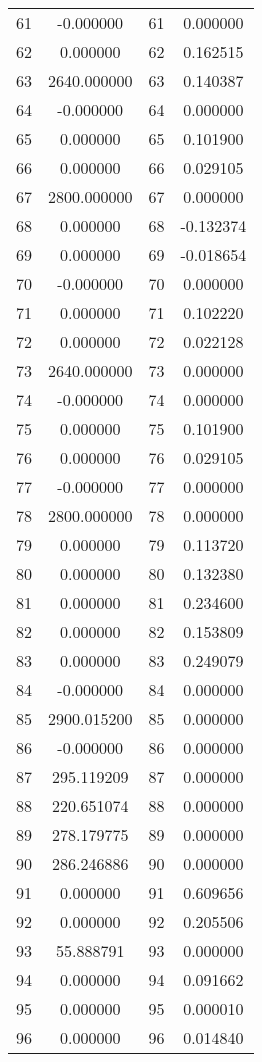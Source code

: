 \documentclass[12pt]{article}
\begin{document}
\begin{longtable}{@{}cccc@{}}
61 & -0.000000 & 61 & 0.000000 \\
62 & 0.000000 & 62 & 0.162515 \\
63 & 2640.000000 & 63 & 0.140387 \\
64 & -0.000000 & 64 & 0.000000 \\
65 & 0.000000 & 65 & 0.101900 \\
66 & 0.000000 & 66 & 0.029105 \\
67 & 2800.000000 & 67 & 0.000000 \\
68 & 0.000000 & 68 & -0.132374 \\
69 & 0.000000 & 69 & -0.018654 \\
70 & -0.000000 & 70 & 0.000000 \\
71 & 0.000000 & 71 & 0.102220 \\
72 & 0.000000 & 72 & 0.022128 \\
73 & 2640.000000 & 73 & 0.000000 \\
74 & -0.000000 & 74 & 0.000000 \\
75 & 0.000000 & 75 & 0.101900 \\
76 & 0.000000 & 76 & 0.029105 \\
77 & -0.000000 & 77 & 0.000000 \\
78 & 2800.000000 & 78 & 0.000000 \\
79 & 0.000000 & 79 & 0.113720 \\
80 & 0.000000 & 80 & 0.132380 \\
81 & 0.000000 & 81 & 0.234600 \\
82 & 0.000000 & 82 & 0.153809 \\
83 & 0.000000 & 83 & 0.249079 \\
84 & -0.000000 & 84 & 0.000000 \\
85 & 2900.015200 & 85 & 0.000000 \\
86 & -0.000000 & 86 & 0.000000 \\
87 & 295.119209 & 87 & 0.000000 \\
88 & 220.651074 & 88 & 0.000000 \\
89 & 278.179775 & 89 & 0.000000 \\
90 & 286.246886 & 90 & 0.000000 \\
91 & 0.000000 & 91 & 0.609656 \\
92 & 0.000000 & 92 & 0.205506 \\
93 & 55.888791 & 93 & 0.000000 \\
94 & 0.000000 & 94 & 0.091662 \\
95 & 0.000000 & 95 & 0.000010 \\
96 & 0.000000 & 96 & 0.014840 \\

\end{longtable}
\end{document}
